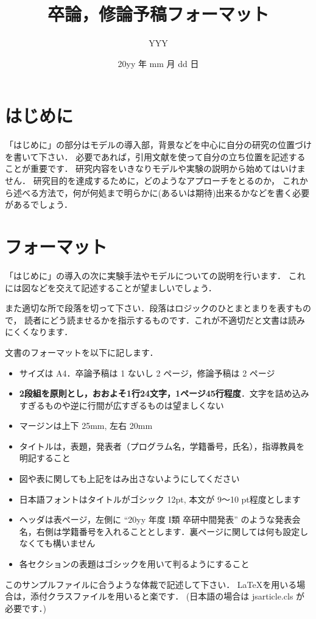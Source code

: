 \documentclass[twocolumn, a4paper]{UECIEresume}
\title{卒論，修論予稿フォーマット}
\date{20yy 年 mm 月 dd 日}
\affiliation{I類 XXX プログラム}
\author{YYY}
\begin{document}
\maketitle

\section{はじめに}

「はじめに」の部分はモデルの導入部，背景などを中心に自分の研究の位置づけを書いて下さい．
必要であれば，引用文献を使って自分の立ち位置を記述することが重要です\cite{Kinoshita}．
研究内容をいきなりモデルや実験の説明から始めてはいけません．
研究目的を達成するために，どのようなアプローチをとるのか，
これから述べる方法で，何が何処まで明らかに(あるいは期待)出来るかなどを書く必要があるでしょう．

\section{フォーマット}

「はじめに」の導入の次に実験手法やモデルについての説明を行います．
これには図などを交えて記述することが望ましいでしょう．

また適切な所で段落を切って下さい．段落はロジックのひとまとまりを表すもので，
読者にどう読ませるかを指示するものです．これが不適切だと文書は読みにくくなります．

文書のフォーマットを以下に記します．
\begin{itemize}
  \item サイズは A4．卒論予稿は 1 ないし 2 ページ，修論予稿は 2 ページ
  \item \textbf{2段組を原則とし，おおよそ1行24文字，1ページ45行程度}．文字を詰め込みすぎるものや逆に行間が広すぎるものは望ましくない
  \item マージンは上下 25mm, 左右 20mm
  \item タイトルは，表題，発表者（プログラム名，学籍番号，氏名），指導教員を明記すること
  \item 図や表に関しても上記をはみ出さないようにしてください
  \item 日本語フォントはタイトルがゴシック 12pt, 本文が 9〜10 pt程度とします
  \item ヘッダは表ページ，左側に ``20yy 年度 I類 卒研中間発表'' のような発表会名，右側は学籍番号を入れることとします．裏ページに関しては何も設定しなくても構いません
  \item 各セクションの表題はゴシックを用いて判るようにすること
\end{itemize}
このサンプルファイルに合うような体裁で記述して下さい．
\LaTeX を用いる場合は，添付クラスファイルを用いると楽です．
(日本語の場合は jsarticle.cls が必要です．)
\end{document}
